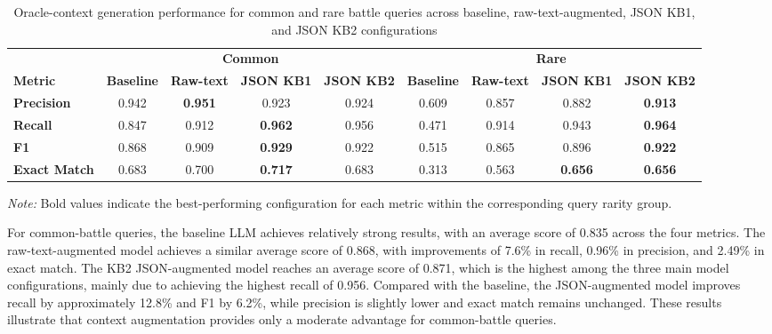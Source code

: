\begin{table}[H]
    \centering
    \caption{Oracle-context generation performance for common and rare battle queries across baseline, raw-text-augmented, JSON KB1, and JSON KB2 configurations}
    \label{tab:oracle_common_rare}

    \scriptsize
    \renewcommand{\arraystretch}{1.4}
    \setlength{\tabcolsep}{4pt}

    \begin{tabular}{l cccc cccc}
        \toprule
        & \multicolumn{4}{c}{\textbf{Common}}
        & \multicolumn{4}{c}{\textbf{Rare}} \\
        \cmidrule(lr){2-5}
        \cmidrule(lr){6-9}

        \textbf{Metric} &
        \textbf{Baseline} &
        \textbf{Raw-text} &
        \textbf{JSON KB1} &
        \textbf{JSON KB2} &
        \textbf{Baseline} &
        \textbf{Raw-text} &
        \textbf{JSON KB1} &
        \textbf{JSON KB2} \\
        \midrule

        \textbf{Precision} &
        0.942 & \textbf{0.951} & 0.923 & 0.924 &
        0.609 & 0.857 & 0.882 & \textbf{0.913} \\

        \textbf{Recall} &
        0.847 & 0.912 & \textbf{0.962} & 0.956 &
        0.471 & 0.914 & 0.943 & \textbf{0.964} \\

        \textbf{F1} &
        0.868 & 0.909 & \textbf{0.929} & 0.922 &
        0.515 & 0.865 & 0.896 & \textbf{0.922} \\

        \textbf{Exact Match} &
        0.683 & 0.700 & \textbf{0.717} & 0.683 &
        0.313 & 0.563 & \textbf{0.656} & \textbf{0.656} \\

        \bottomrule
    \end{tabular}

    \par\vspace{4pt}
    \begin{minipage}{\linewidth}
        \footnotesize
        \textit{Note:} Bold values indicate the
        best-performing configuration for each metric
        within the corresponding query rarity group.
    \end{minipage}

\end{table}
For common-battle queries, the baseline LLM achieves relatively strong results, with an average score of 0.835 across the four metrics. The raw-text-augmented model achieves a similar average score of 0.868, with improvements of 7.6\% in recall, 0.96\% in precision, and 2.49\% in exact match. The KB2 JSON-augmented model reaches an average score of 0.871, which is the highest among the three main model configurations, mainly due to achieving the highest recall of 0.956. Compared with the baseline, the JSON-augmented model improves recall by approximately 12.8\% and F1 by 6.2\%, while precision is slightly lower and exact match remains unchanged. These results illustrate that context augmentation provides only a moderate advantage for common-battle queries.

